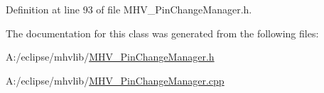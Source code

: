Definition at line 93 of file M\-H\-V\-\_\-\-Pin\-Change\-Manager.\-h.



The documentation for this class was generated from the following files\-:\begin{DoxyCompactItemize}
\item 
A\-:/eclipse/mhvlib/\hyperlink{_m_h_v___pin_change_manager_8h}{M\-H\-V\-\_\-\-Pin\-Change\-Manager.\-h}\item 
A\-:/eclipse/mhvlib/\hyperlink{_m_h_v___pin_change_manager_8cpp}{M\-H\-V\-\_\-\-Pin\-Change\-Manager.\-cpp}\end{DoxyCompactItemize}
